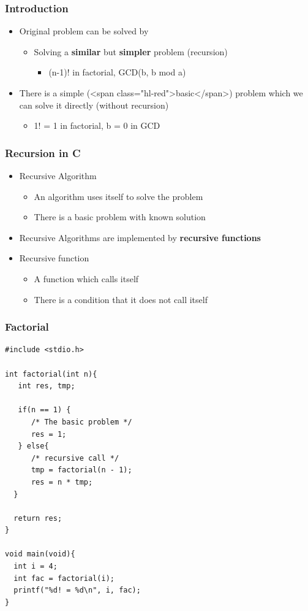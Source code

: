 \documentclass{../c-lecture}
\begin{document}
\begin{frame}
  \frametitle{Introduction}
  \begin{itemize}
    \item Original problem can be solved by
    \begin{itemize}
      \item
        Solving a \textbf{\color{Orange} similar} but
        \textbf{\color{LimeGreen} simpler} problem (recursion)
      \begin{itemize}
        \item (n-1)! in factorial, GCD(b, b mod a)
      \end{itemize}
    \end{itemize}
    \item
      There is a simple (<span class="hl-red">basic</span>) problem which we can
      solve it directly (without recursion)
    \begin{itemize}
      \item 1! = 1 in factorial, b = 0 in GCD
    \end{itemize}
  \end{itemize}
\end{frame}

\begin{frame}
  \frametitle{Recursion in C}
  \begin{itemize}
    \item Recursive Algorithm
    \begin{itemize}
      \item An algorithm uses itself to solve the problem
      \item There is a basic problem with known solution
    \end{itemize}
    \item
      Recursive Algorithms are implemented by
      \textbf{\color{Orange} recursive functions}
    \item Recursive function
    \begin{itemize}
      \item A function which calls itself
      \item There is a condition that it does not call itself
    \end{itemize}
  \end{itemize}
\end{frame}

\begin{frame}[fragile]
  \frametitle{Factorial}
  \scriptsize
  \begin{verbatim}
#include <stdio.h>

int factorial(int n){
   int res, tmp;

   if(n == 1) {
      /* The basic problem */
      res = 1;
   } else{
      /* recursive call */
      tmp = factorial(n - 1);
      res = n * tmp;
  }

  return res;
}

void main(void){
  int i = 4;
  int fac = factorial(i);
  printf("%d! = %d\n", i, fac);
}
  \end{verbatim}
\end{frame}
\end{document}
